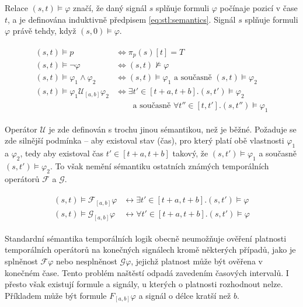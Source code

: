 Re\-la\-ce $(s, t) \models \varphi$ značí, že daný signál $s$ splňuje formuli $\varphi$
počínaje pozicí v čase $t$, a je definována induktivně předpisem \ref{eq:stl:semantics}.
Signál $s$ splňuje formuli $\varphi$ právě tehdy, když $(s, 0) \models \varphi$.

\begin{align}\label{eq:stl:semantics}
\begin{array}{ll}
(s, t) \models p				&\Longleftrightarrow \pi_p(s)[t] = T			\\
(s, t) \models \neg \varphi		&\Longleftrightarrow (s, t) \not\models \varphi	\\
(s, t) \models \varphi_1 \wedge \varphi_2	&\Longleftrightarrow (s, t) \models \varphi_1 \textrm{ a současně } (s, t) \models \varphi_2	\\
(s, t) \models \varphi_1 \mathcal{U}_{[a,b]} \varphi_2 	&\Longleftrightarrow \exists t' \in [t+a, t+b] . (s, t') \models \varphi_2			\\														
&~~~~~~~~\textrm{ a současně } \forall t'' \in [t, t'] . (s, t'') \models \varphi_1
\end{array}
\end{align}

Operátor $\mathcal{U}$ je zde definován s trochu jinou sé\-man\-ti\-kou,
než je běžné. Požaduje se zde silnější podmínka -- aby existoval stav (čas),
pro který platí obě vlastnosti $\varphi_1$ a $\varphi_2$, tedy aby existoval
čas $t' \in [t + a, t + b]$ takový, že $(s, t') \models \varphi_1$
a současně $(s, t') \models \varphi_2$. To však nemění sémantiku ostatních známých
temporálních operátorů $\mathcal{F}$ a $\mathcal{G}$.

\begin{align}\label{eq:stl:semantics}
\begin{array}{ll}
(s, t) \models \mathcal{F}_{[a,b]}\varphi &\longleftrightarrow	\exists t'\in[t+a, t+b].(s,t') \models \varphi		\\
(s, t) \models \mathcal{G}_{[a,b]}\varphi &\longleftrightarrow	\forall t'\in[t+a, t+b].(s,t') \models \varphi
\end{array}
\end{align}

Standardní sémantika temporálních logik obecně neumožňuje ověření platnosti temporálních operátorů
na konečných signálech kromě některých případů, jako je splněnost $\mathcal{F}\varphi$
nebo nesplněnost $\mathcal{G}\varphi$, jejichž platnost může být ověřena v konečném čase.
Tento problém naštěstí odpadá zavedením časových intervalů. I přesto však existují
formule a signály, u kterých o platnosti rozhodnout nelze. Příkladem může být formule $F_{[a, b]}\varphi$
a signál o délce kratší než $b$.

